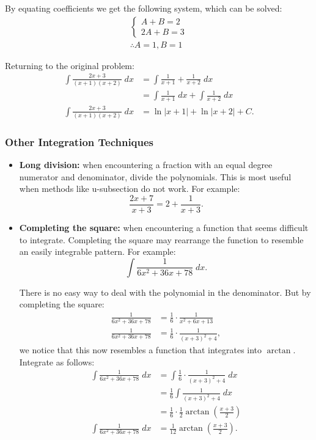 \noindent By equating coefficients we get the following system, which can be solved:
\begin{gather*}
	\begin{cases}
		A + B = 2 \\
		2A + B = 3
	\end{cases} \\
	\therefore A = 1, B = 1
\end{gather*}

\noindent Returning to the original problem:
\begin{align*}
	\int \frac{2x + 3}{(x + 1)(x + 2)} \; dx &= \int \frac{1}{x + 1} + \frac{1}{x + 2} \; dx \\[5pt]
	&= \int \frac{1}{x + 1} \; dx + \int \frac{1}{x + 2} \; dx \\[5pt]
	\int \frac{2x + 3}{(x + 1)(x + 2)} \; dx &= \ln |x + 1| + \ln |x + 2| + C.
\end{align*}

\subsubsection{Other Integration Techniques}
\begin{itemize}
	\item \textbf{Long division:} when encountering a fraction with an equal degree numerator and denominator, divide the polynomials. This is most useful when methods like u-subsection do not work. For example:
	\[ \frac{2x + 7}{x + 3} = 2 + \frac{1}{x + 3}. \]

	\item \textbf{Completing the square:} when encountering a function that seems difficult to integrate. Completing the square may rearrange the function to resemble an easily integrable pattern. For example:
	\[ \int \frac{1}{6x^2 + 36x + 78} \; dx. \]

	There is no easy way to deal with the polynomial in the denominator. But by completing the square:
	\begin{align*}
		\frac{1}{6x^2 + 36x + 78} &= \frac{1}{6} \cdot \frac{1}{x^2 + 6x + 13} \\[5pt]
		\frac{1}{6x^2 + 36x + 78} &= \frac{1}{6} \cdot \frac{1}{(x + 3)^2 + 4},
	\end{align*}
	we notice that this now resembles a function that integrates into $\arctan$. Integrate as follows:
	\begin{align*}
		\int \frac{1}{6x^2 + 36x + 78} \; dx &= \int \frac{1}{6} \cdot \frac{1}{(x + 3)^2 + 4} \; dx \\[5pt]
		&= \frac{1}{6} \int \frac{1}{(x + 3)^2 + 4} \; dx \\[5pt]
		&= \frac{1}{6} \cdot \frac{1}{2} \arctan \left( \frac{x + 3}{2} \right) \\[5pt]
		\int \frac{1}{6x^2 + 36x + 78} \; dx &= \frac{1}{12} \arctan \left( \frac{x + 3}{2} \right).
	\end{align*}
\end{itemize}

